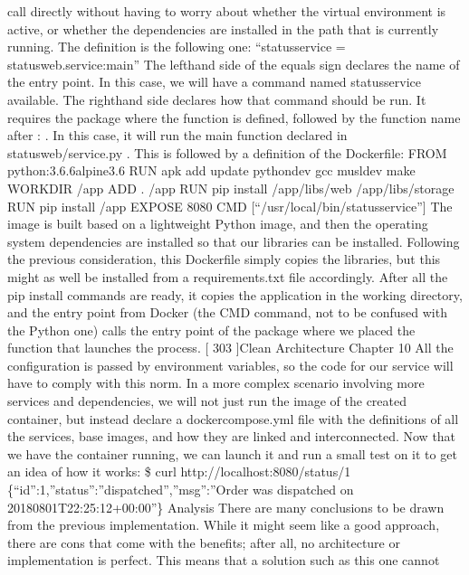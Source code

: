 \documentclass[a4paper,10pt,english]{sphinxmanual}
\begin{document}
call directly without having to worry about whether the virtual environment is active, or
whether the dependencies are installed in the path that is currently running.
The definition is the following one:
“status\sphinxhyphen{}service = statusweb.service:main”
The left\sphinxhyphen{}hand side of the equals sign declares the name of the entry point. In this case, we
will have a command named status\sphinxhyphen{}service available. The right\sphinxhyphen{}hand side declares how
that command should be run. It requires the package where the function is defined,
followed by the function name after : . In this case, it will run the main function declared in
statusweb/service.py .
This is followed by a definition of the Dockerfile:
FROM python:3.6.6\sphinxhyphen{}alpine3.6
RUN apk add \textendash{}update python\sphinxhyphen{}dev gcc musl\sphinxhyphen{}dev make
WORKDIR /app
ADD . /app
RUN pip install /app/libs/web /app/libs/storage
RUN pip install /app
EXPOSE 8080
CMD {[}“/usr/local/bin/status\sphinxhyphen{}service”{]}
The image is built based on a lightweight Python image, and then the operating system
dependencies are installed so that our libraries can be installed. Following the previous
consideration, this Dockerfile simply copies the libraries, but this might as well be
installed from a requirements.txt file accordingly. After all the pip install
commands are ready, it copies the application in the working directory, and the entry point
from Docker (the CMD command, not to be confused with the Python one) calls the entry
point of the package where we placed the function that launches the process.
{[} 303 {]}Clean Architecture
Chapter 10
All the configuration is passed by environment variables, so the code for our service will
have to comply with this norm.
In a more complex scenario involving more services and dependencies, we will not just run
the image of the created container, but instead declare a docker\sphinxhyphen{}compose.yml file with
the definitions of all the services, base images, and how they are linked and interconnected.
Now that we have the container running, we can launch it and run a small test on it to get
an idea of how it works:
\$ curl http://localhost:8080/status/1
\{“id”:1,”status”:”dispatched”,”msg”:”Order was dispatched on
2018\sphinxhyphen{}08\sphinxhyphen{}01T22:25:12+00:00”\}
Analysis
There are many conclusions to be drawn from the previous implementation. While it might
seem like a good approach, there are cons that come with the benefits; after all, no
architecture or implementation is perfect. This means that a solution such as this one cannot
\end{document}
